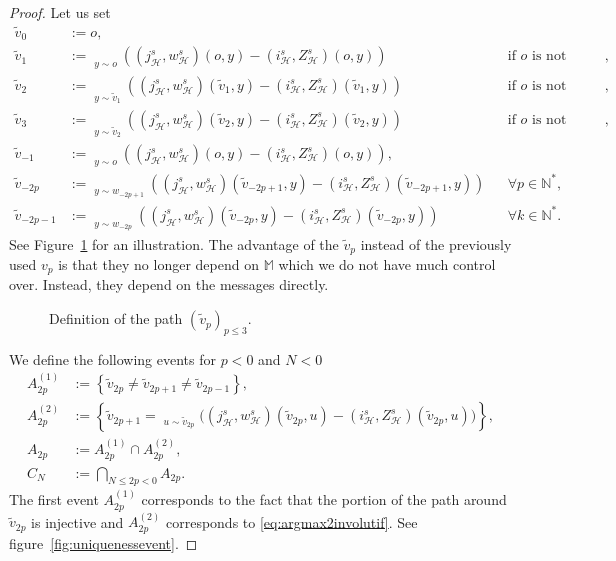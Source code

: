 \documentclass[10pt,a4paper]{amsart}
\DeclareMathOperator*{\argmax}{argmax}
\DeclareMathOperator*{\argmaxlex}{\overset{\lex}{\argmax}}
\DeclareMathOperator*{\argmaxxlex}{\overset{[2],\lex}{\argmax}}
\DeclareMathOperator{\lex}{lex}
\begin{document}
\begin{proof}
Let us set
\begin{align*}
\tilde{v}_0&:=o ,\\
\tilde{v}_{1}&:=\underset{y \sim o}{\argmaxxlex}((j_{\mathcal{H}}^s,w_{\mathcal{H}}^s)(o,y)-(i^s_{\mathcal{H}},Z^s_{\mathcal{H}})(o,y)) &&\text{if }o\text{ is not isolated} ,\\
\tilde{v}_{2}&:=\underset{y \sim \tilde{v}_1}{\argmaxlex}((j_{\mathcal{H}}^s,w_{\mathcal{H}}^s)(\tilde{v}_1,y)-(i^s_{\mathcal{H}},Z^s_{\mathcal{H}})(\tilde{v}_1,y)) &&\text{if }o\text{ is not isolated} ,\\
\tilde{v}_{3}&:=\underset{y \sim \tilde{v}_2}{\argmaxxlex}((j_{\mathcal{H}}^s,w_{\mathcal{H}}^s)(\tilde{v}_2,y)-(i^s_{\mathcal{H}},Z^s_{\mathcal{H}})(\tilde{v}_2,y))&&\text{if }o\text{ is not isolated} ,\\
\tilde{v}_{-1}&:=\underset{y \sim o}{\argmaxlex}((j_{\mathcal{H}}^s,w_{\mathcal{H}}^s)(o,y)-(i^s_{\mathcal{H}},Z^s_{\mathcal{H}})(o,y)) ,\\
\tilde{v}_{-2p}&:=\underset{y \sim w_{-2p+1}}{\argmaxxlex}((j_{\mathcal{H}}^s,w_{\mathcal{H}}^s)(\tilde{v}_{-2p+1},y)-(i^s_{\mathcal{H}},Z^s_{\mathcal{H}})(\tilde{v}_{-2p+1},y))  &&\forall p \in \mathbb{N}^*,\\
\tilde{v}_{-2p-1}&:=\underset{y \sim w_{-2p}}{\argmaxlex}((j_{\mathcal{H}}^s,w_{\mathcal{H}}^s)(\tilde{v}_{-2p},y)-(i^s_{\mathcal{H}},Z^s_{\mathcal{H}})(\tilde{v}_{-2p},y))  &&\forall k \in \mathbb{N}^* .
\end{align*}
See Figure~\ref{fig:infpath} for an illustration.
The advantage of the $\tilde{v}_p$ instead of the previously used $v_p$ is that they no longer depend on $\mathbb{M}$ which we do not have much control over. Instead, they depend on the messages directly.
\begin{figure}
    \centering
    
    \caption{Definition of the path $(\tilde{v}_p)_{p\leq3}$.}
    \label{fig:infpath}
\end{figure}


We define the following events  for $p<0$ and $N < 0$
\begin{align}
A_{2p}^{(1)} &:= \left\{ \tilde{v}_{2p} \neq \tilde{v}_{2p+1} \neq \tilde{v}_{2p-1} \right\},\\
A_{2p}^{(2)} &:= \left\{  \tilde{v}_{2p+1} =\argmaxxlex_{u \sim \tilde{v}_{2p}}\bigg( (j_{\mathcal{H}}^s,w_{\mathcal{H}}^s)(\tilde{v}_{2p},u)- (i_{\mathcal{H}}^s,Z_{\mathcal{H}}^s)(\tilde{v}_{2p},u)\bigg) \right\},\\
A_{2p} &:= A_{2p}^{(1)} \cap A_{2p}^{(2)},\\
C_{N} &:=\bigcap_{N \leq 2p < 0} A_{2p} . 
\end{align}
The first event $A_{2p}^{(1)}$ corresponds to the fact that the portion of the path around $\tilde{v}_{2p}$ is injective and  $A_{2p}^{(2)}$ corresponds to \eqref{eq:argmax2involutif}. See figure~\ref{fig:uniquenessevent}.


\end{proof}
\end{document}
